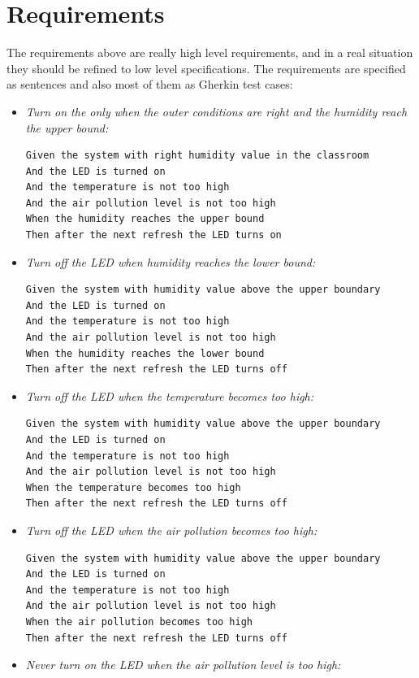 \documentclass{article}
\begin{document}
\section{Requirements} The requirements above are really high level requirements, and in a real situation they should be refined to low level specifications. The requirements are specified as sentences and also most of them as Gherkin test cases: \\
\begin{itemize}

\item \textit{Turn on the only when the outer conditions are right and the humidity reach the upper bound:}
\begin{verbatim}
Given the system with right humidity value in the classroom
And the LED is turned on
And the temperature is not too high
And the air pollution level is not too high
When the humidity reaches the upper bound
Then after the next refresh the LED turns on
\end{verbatim}
\item \textit{Turn off the LED when humidity reaches the lower bound:}
\begin{verbatim}
Given the system with humidity value above the upper boundary
And the LED is turned on
And the temperature is not too high
And the air pollution level is not too high
When the humidity reaches the lower bound
Then after the next refresh the LED turns off
\end{verbatim}
\item \textit{Turn off the LED when the temperature becomes too high:}
\begin{verbatim}
Given the system with humidity value above the upper boundary
And the LED is turned on
And the temperature is not too high
And the air pollution level is not too high
When the temperature becomes too high
Then after the next refresh the LED turns off
\end{verbatim}
\item \textit{Turn off the LED when the air pollution becomes too high:}
\begin{verbatim}
Given the system with humidity value above the upper boundary
And the LED is turned on
And the temperature is not too high
And the air pollution level is not too high
When the air pollution becomes too high
Then after the next refresh the LED turns off
\end{verbatim}
\item \textit{Never turn on the LED when the air pollution level is too high:}

\end{itemize}
\end{document}
